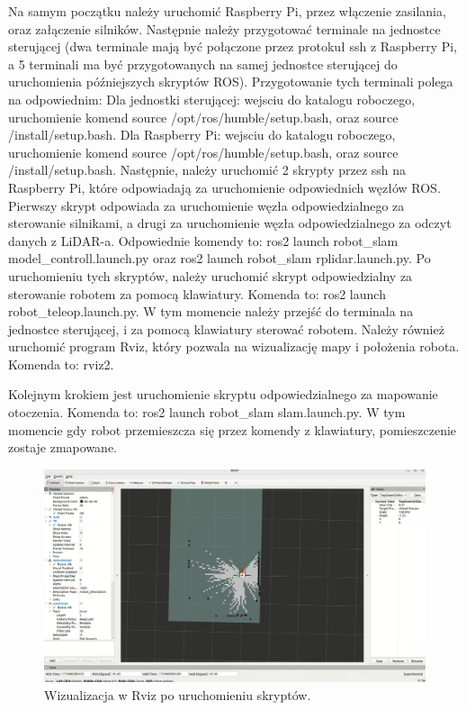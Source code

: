 \documentclass[a4paper,twoside,12pt]{book}
\begin{document}
Na samym początku należy uruchomić Raspberry Pi, przez włączenie zasilania, oraz załączenie silników.
\newline\newline
Następnie należy przygotować terminale na jednostce sterującej (dwa terminale mają być połączone przez protokuł ssh z Raspberry Pi, a 5 terminali ma być przygotowanych na samej jednostce sterującej do uruchomienia późniejszych skryptów ROS). Przygotowanie tych terminali polega na odpowiednim:
\newline\newline
Dla jednostki sterującej: wejsciu do katalogu roboczego, uruchomienie komend source /opt/ros/humble/setup.bash, oraz source /install/setup.bash.
\newline\newline
Dla Raspberry Pi: wejsciu do katalogu roboczego, uruchomienie komend source /opt/ros/humble/setup.bash, oraz source /install/setup.bash.
\newline\newline
Następnie, należy uruchomić 2 skrypty przez ssh na Raspberry Pi, które odpowiadają za uruchomienie odpowiednich węzłów ROS. Pierwszy skrypt odpowiada za uruchomienie węzła odpowiedzialnego za sterowanie silnikami, a drugi za uruchomienie węzła odpowiedzialnego za odczyt danych z LiDAR-a. Odpowiednie komendy to: ros2 launch robot\_slam model\_controll.launch.py oraz ros2 launch robot\_slam rplidar.launch.py.
\newline\newline
\newpage
Po uruchomieniu tych skryptów, należy uruchomić skrypt odpowiedzialny za sterowanie robotem za pomocą klawiatury. Komenda to: ros2 launch robot\_teleop.launch.py. W tym momencie należy przejść do terminala na jednostce sterującej, i za pomocą klawiatury sterować robotem. Należy również uruchomić program Rviz, który pozwala na wizualizację mapy i położenia robota. Komenda to: rviz2.
\newline

Kolejnym krokiem jest uruchomienie skryptu odpowiedzialnego za mapowanie otoczenia. Komenda to: ros2 launch robot\_slam slam.launch.py. W tym momencie gdy robot przemieszcza się przez komendy z klawiatury, pomieszczenie zostaje zmapowane.

\begin{figure}[!hb]
	\centering
	\includegraphics[width=1\textwidth]{images/launch-map.png}
	\caption{Wizualizacja w Rviz po uruchomieniu skryptów.}
	\label{fig:launch-map}
\end{figure}
\end{document}
